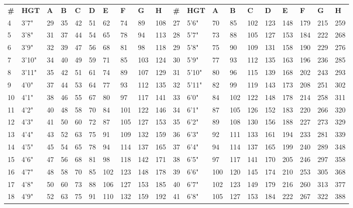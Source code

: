 \begin{tabularx}{\linewidth}{@{} X X X X X X X X X X | X X X X X X X X X X}
\small
\textbf{\#} & \textbf{HGT} & \textbf{A} & \textbf{B} & \textbf{C} & \textbf{D} & \textbf{E} & \textbf{F} & \textbf{G} & \textbf{H} & \textbf{\#} & \textbf{HGT} & \textbf{A} & \textbf{B} & \textbf{C} & \textbf{D} & \textbf{E} & \textbf{F} & \textbf{G} & \textbf{H}\\
4 & 3'7" & 29 & 35 & 42 & 51 & 62 & 74 & 89 & 108 & 27 & 5'6" & 70 & 85 & 102 & 123 & 148 & 179 & 215 & 259\\
5 & 3'8" & 31 & 37 & 44 & 54 & 65 & 78 & 94 & 113 & 28 & 5'7" & 73 & 88 & 105 & 127 & 153 & 184 & 222 & 268\\
6 & 3'9" & 32 & 39 & 47 & 56 & 68 & 81 & 98 & 118 & 29 & 5'8" & 75 & 90 & 109 & 131 & 158 & 190 & 229 & 276\\
7 & 3'10" & 34 & 40 & 49 & 59 & 71 & 85 & 103 & 124 & 30 & 5'9" & 77 & 93 & 112 & 135 & 163 & 196 & 236 & 285\\
8 & 3'11" & 35 & 42 & 51 & 61 & 74 & 89 & 107 & 129 & 31 & 5'10" & 80 & 96 & 115 & 139 & 168 & 202 & 243 & 293\\
9 & 4'0" & 37 & 44 & 53 & 64 & 77 & 93 & 112 & 135 & 32 & 5'11" & 82 & 99 & 119 & 143 & 173 & 208 & 251 & 302\\
10 & 4'1" & 38 & 46 & 55 & 67 & 80 & 97 & 117 & 141 & 33 & 6'0" & 84 & 102 & 122 & 148 & 178 & 214 & 258 & 311\\
11 & 4'2" & 40 & 48 & 58 & 70 & 84 & 101 & 122 & 146 & 34 & 6'1" & 87 & 105 & 126 & 152 & 183 & 220 & 266 & 320\\
12 & 4'3" & 41 & 50 & 60 & 72 & 87 & 105 & 127 & 153 & 35 & 6'2" & 89 & 108 & 130 & 156 & 188 & 227 & 273 & 329\\
13 & 4'4" & 43 & 52 & 63 & 75 & 91 & 109 & 132 & 159 & 36 & 6'3" & 92 & 111 & 133 & 161 & 194 & 233 & 281 & 339\\
14 & 4'5" & 45 & 54 & 65 & 78 & 94 & 114 & 137 & 165 & 37 & 6'4" & 94 & 114 & 137 & 165 & 199 & 240 & 289 & 348\\
15 & 4'6" & 47 & 56 & 68 & 81 & 98 & 118 & 142 & 171 & 38 & 6'5" & 97 & 117 & 141 & 170 & 205 & 246 & 297 & 358\\
16 & 4'7" & 48 & 58 & 70 & 85 & 102 & 123 & 148 & 178 & 39 & 6'6" & 100 & 120 & 145 & 174 & 210 & 253 & 305 & 368\\
17 & 4'8" & 50 & 60 & 73 & 88 & 106 & 127 & 153 & 185 & 40 & 6'7" & 102 & 123 & 149 & 179 & 216 & 260 & 313 & 377\\
18 & 4'9" & 52 & 63 & 75 & 91 & 110 & 132 & 159 & 192 & 41 & 6'8" & 105 & 127 & 153 & 184 & 222 & 267 & 322 & 388\\

\end{tabularx}
